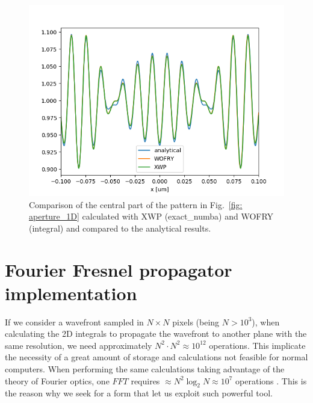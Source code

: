 \documentclass{iucr}              %
\begin{document}
\begin{figure}
\label{fig: aperture_1D_analytical}
\caption{Comparison of the central part of the pattern in Fig.~\ref{fig: aperture_1D} calculated with XWP (exact\_numba) and WOFRY (integral) and compared to the analytical results.
}
\includegraphics[width=1\textwidth]{aperture_1D_analytical.png}
\end{figure}


\section{Fourier Fresnel propagator implementation}
\label{ch: fourier-propagators}


If we consider a wavefront sampled in $N \times N$ pixels (being $N > 10^3$), when calculating the 2D integrals to propagate the wavefront to another plane with the same resolution, we need approximately $N^2\cdot N^2 \approx 10^{12}$ operations. This implicate the necessity of a great amount of storage and calculations not feasible for normal computers. When performing the same calculations taking advantage of the theory of Fourier optics, one $FFT$ requires $\approx N^2 \log_2 N \approx 10^7$ operations \cite{Marshall:1992:CVM:129191}. This is the reason why we seek for a form that let us exploit such powerful tool. 
\end{document}
